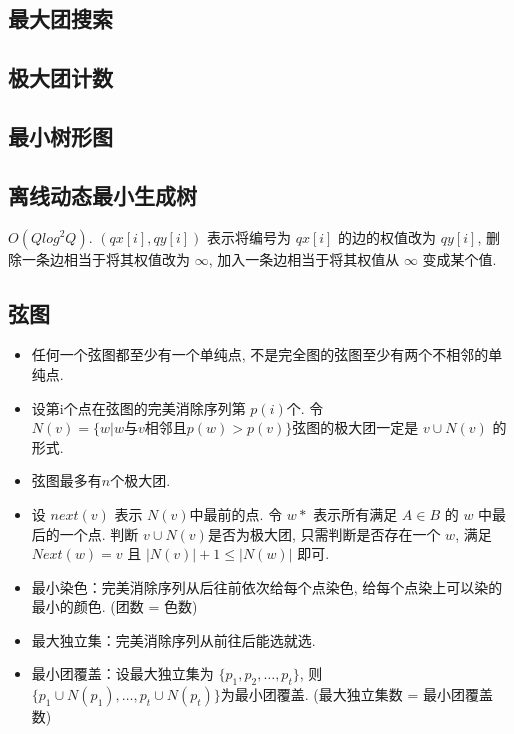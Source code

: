 \documentclass[landscape, twocolumn, 8pt, a4paper, twoside]{extarticle}
\begin{document}
\begin{spacing}{0.1}
\subsection{最大团搜索}


\subsection{极大团计数}


\subsection{最小树形图}


\subsection{离线动态最小生成树}
$O (Q log^2 Q) $.
$(qx[i], qy[i])$ 表示将编号为 $qx[i]$ 的边的权值改为 $qy[i]$,
删除一条边相当于将其权值改为 $\infty$,
加入一条边相当于将其权值从 $\infty$ 变成某个值.


\subsection{弦图}
\begin{itemize}
\item 任何一个弦图都至少有一个单纯点, 不是完全图的弦图至少有两个不相邻的单纯点. 
\item 设第i个点在弦图的完美消除序列第 $p(i)$个. 令 $N(v) = \{w | w \text{与} v \text{相邻且} p(w) > p(v) \}$弦图的极大团一定是 $v \cup N(v)$ 的形式. 
\item 弦图最多有$n$个极大团. 
\item 设 $next(v)$ 表示 $N(v)$中最前的点. 令 $w*$ 表示所有满足 $A\in B$ 的 $w$ 中最后的一个点. 
  判断 $v \cup N(v)$是否为极大团,
  只需判断是否存在一个 $w$, 
  满足 $Next(w) = v$ 且 $|N(v)| + 1 \le |N(w)|$ 即可. 
\item 最小染色：完美消除序列从后往前依次给每个点染色, 给每个点染上可以染的最小的颜色. (团数 = 色数)
\item 最大独立集：完美消除序列从前往后能选就选. 
\item 最小团覆盖：设最大独立集为 $\{p_1, p_2, \ldots, p_t\}$, 则 $\{p_1 \cup N(p_1), \ldots, p_t \cup N(p_t) \}$为最小团覆盖.  (最大独立集数 = 最小团覆盖数)
\end{itemize}


\end{spacing}
\end{document}
